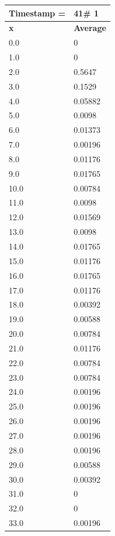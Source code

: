 \begin{tabular}{|l||l|}
\hline
\textbf{Timestamp =} & \textbf{41}\# 1\\\hline
	\textbf{x} & \textbf{Average} \\ \hline
\hline
	0.0 & 0 \\ \hline
	1.0 & 0 \\ \hline
	2.0 & 0.5647 \\ \hline
	3.0 & 0.1529 \\ \hline
	4.0 & 0.05882 \\ \hline
	5.0 & 0.0098 \\ \hline
	6.0 & 0.01373 \\ \hline
	7.0 & 0.00196 \\ \hline
	8.0 & 0.01176 \\ \hline
	9.0 & 0.01765 \\ \hline
	10.0 & 0.00784 \\ \hline
	11.0 & 0.0098 \\ \hline
	12.0 & 0.01569 \\ \hline
	13.0 & 0.0098 \\ \hline
	14.0 & 0.01765 \\ \hline
	15.0 & 0.01176 \\ \hline
	16.0 & 0.01765 \\ \hline
	17.0 & 0.01176 \\ \hline
	18.0 & 0.00392 \\ \hline
	19.0 & 0.00588 \\ \hline
	20.0 & 0.00784 \\ \hline
	21.0 & 0.01176 \\ \hline
	22.0 & 0.00784 \\ \hline
	23.0 & 0.00784 \\ \hline
	24.0 & 0.00196 \\ \hline
	25.0 & 0.00196 \\ \hline
	26.0 & 0.00196 \\ \hline
	27.0 & 0.00196 \\ \hline
	28.0 & 0.00196 \\ \hline
	29.0 & 0.00588 \\ \hline
	30.0 & 0.00392 \\ \hline
	31.0 & 0 \\ \hline
	32.0 & 0 \\ \hline
	33.0 & 0.00196 \\ \hline
\end{tabular}

